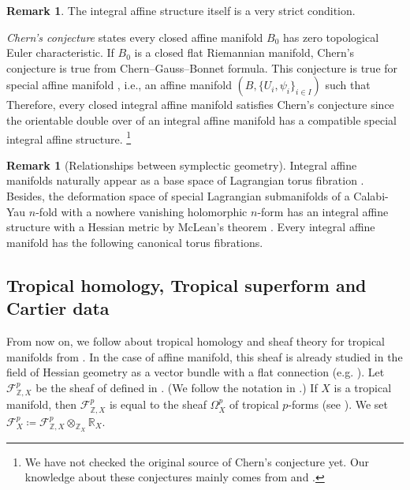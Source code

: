 \documentclass[a4paper,dvipdfmx,reqno,12pt]{amsart}
\makeatletter
\newcommand{\ind}[2]{\emph{#1}\index{1{#2}@{#1}}}
\theoremstyle{definition}
\newtheorem{remark}[theorem]{Remark}
\newcommand{\deq}{\coloneqq}
\newcommand{\myfootnote}[1]{\hspace{-5pt}\footnote{#1}}
\numberwithin{equation}{section}
\makeatother
\begin{document}
\begin{remark}
The integral affine structure itself is a very strict condition.

\ind{Chern's conjecture}{Chern's conjecture} states 
every closed affine manifold $B_0$ has zero topological 
Euler characteristic.
If $B_0$ is a closed flat Riemannian manifold, Chern's conjecture is true from Chern--Gauss--Bonnet formula.
This conjecture is true for special affine manifold \cite{MR3665000}
, i.e., an affine manifold $(B, \{U_i,\psi_i\}_{i\in I})$ such that 
$ $
Therefore, every closed integral affine manifold satisfies Chern's conjecture since the orientable double over of an integral affine manifold has a compatible special integral affine structure.
\myfootnote{We have not checked 
the original source of Chern's conjecture yet.
Our knowledge about these conjectures
mainly comes from \cite{goldmanRadianceObstructionParallel1984a}
and \cite{MR3665000}.
}
\end{remark}

\begin{remark}[{Relationships between symplectic geometry}]
Integral affine manifolds naturally appear 
as a base space of Lagrangian torus fibration 
\cite{duistermaatGlobalActionangleCoordinates1980a}. 
Besides, the deformation space of 
special Lagrangian submanifolds of
a Calabi-Yau $n$-fold with a nowhere vanishing 
holomorphic $n$-form has 
an integral affine structure with 
a Hessian metric by McLean's theorem \cite{MR1664890}.
Every integral affine manifold has 
the following canonical torus fibrations.
\end{remark}







\subsection{Tropical homology, Tropical superform and Cartier data}
From now on, we follow about tropical homology and sheaf 
theory for tropical manifolds
from \cite{mikhalkinTropicalEigenwaveIntermediate2014a,
MR3903579,gross2019sheaftheoretic}.
In the case of affine manifold, this sheaf is already
studied in the field of Hessian geometry as a vector bundle
with a flat connection
(e.g. \cite[Chapter 7]{MR2293045}).
Let $\mathcal{F}^{p}_{\mathbb{Z},X}$ be 
the sheaf of  defined in 
\cite[2.4]{mikhalkinTropicalEigenwaveIntermediate2014a}.
 (We follow the notation in \cite[Definition 2.4]{MR3894860}.)
If $X$ is a tropical manifold, then 
$\mathcal{F}^{p}_{\mathbb{Z},X}$ is equal 
to the sheaf $\Omega_{X}^{p}$ of tropical $p$-forms 
\cite[Definition 2.7]{gross2019sheaftheoretic}
(see \cite[Remark 2.8]{gross2019sheaftheoretic}).
We set $\mathcal{F}^{p}_{X}\deq 
\mathcal{F}^{p}_{\mathbb{Z}, X}
\otimes_{\mathbb{Z}_X}\mathbb{R}_X$.
\end{document}
